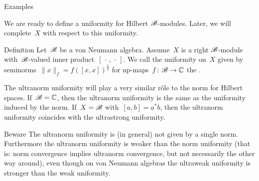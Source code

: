 \begin{parsec}
\begin{point}{Examples}
\begin{enumerate}
    \end{enumerate}
\begin{point}%
We are ready to define a uniformity for Hilbert $\mathscr{B}$-modules.
Later, we will complete~$X$ with respect to this uniformity.
\end{point}
\end{point}
\begin{point}{Definition}%
Let~$\mathscr{B}$ be a von Neumann algebra.
Assume~$X$ is a right $\mathscr{B}$-module
    with~$\mathscr{B}$-valued inner product~$[\,\cdot\,,\,\cdot\,]$.
We call the uniformity on~$X$
    given by seminorms~$\|x\|_f = f([x,x])^{\frac{1}{2}}$
    for np-maps~$f\colon \mathscr{B} \to \mathbb{C}$
    the .
\begin{point}%
The ultranorm uniformity will play a very similar r\^ole
    to the norm for Hilbert spaces.
If~$\mathscr{B}=\mathbb{C}$, then the ultranorm uniformity is
    the same as the uniformity induced by the norm.
If~$X=\mathscr{B}$ with~$[a,b]=a^*b$,
    then the ultranorm uniformity coincides with the ultrastrong uniformity.
\end{point}
\begin{point}{Beware}%
    The ultranorm uniformity is (in general) not given by a single norm.
    Furthermore the ultranorm uniformity is weaker than the norm uniformity
        (that is: norm convergence implies ultranorm convergence,
            but not necessarily the other way around),
        even though on von Neumann algebras the
        ultraweak uniformity
        is stronger than the weak uniformity.
\end{point}
\end{point}
\end{parsec}

